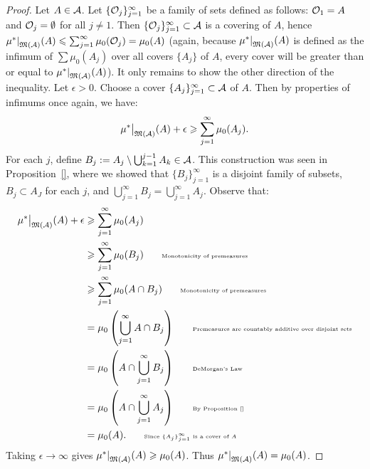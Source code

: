 \begin{proof}
            Let $A \in \mathcal{A}$. Let $\{\mathcal{O}_j\}_{j = 1}^\infty$ be a family of sets defined as follows: $\mathcal{O}_1 = A$ and $\mathcal{O}_j = \emptyset$ for all $j \neq 1$. Then $\{\mathcal{O}_j\}_{j = 1}^\infty \subset \mathcal{A}$ is a covering of $A$, hence $\restr{\mu^\ast}{\fM(\cA)}(A) \leq \sum_{j = 1}^\infty \mu_0(\cO_j) = \mu_0(A)$ (again, because $\restr{\mu^\ast}{\fM(\cA)}(A)$ is defined as the infimum of $\sum \mu_0(A_j)$ over all covers $\{A_j\}$ of $A$, every cover will be greater than or equal to $\restr{\mu^\ast}{\fM(\cA)}(A)$). It only remains to show the other direction of the inequality. Let $\epsilon > 0$. Choose a cover $\{A_j\}_{j = 1}^\infty \subset \mathcal{A}$ of $A$. Then by properties of infimums once again, we have:
                \begin{equation*}
                \begin{split}
                    \restr{\mu^\ast}{\fM(\cA)}(A) + \epsilon \geq \sum_{j = 1}^\infty \mu_0 (A_j).
                \end{split}
                \end{equation*}
            For each $j$, define $B_j := A_j \setminus \bigcup_{k = 1}^{j-1}A_k \in \mathcal{A}$. This construction was seen in Proposition~\ref{}, where we showed that $\{B_j\}_{j = 1}^\infty$ is a disjoint family of subsets, $B_j \subset A_J$ for each $j$, and $\bigcup_{j = 1}^\infty B_j = \bigcup_{j = 1}^\infty A_j$. Observe that:
                \begin{equation*}
                \begin{split}
                    \restr{\mu^\ast}{\fM(\cA)}(A) + \epsilon 
                    & \geq \sum_{j = 1}^\infty \mu_0(A_j) \\
                    & \geq \sum_{j = 1}^\infty \mu_0(B_j) \h9\h9 \text{\tiny Monotonicity of premeasures}\\
                    & \geq \sum_{j = 1}^\infty \mu_0(A \cap B_j) \h9\h9 \text{\tiny Monotonicity of premeasures}\\
                    & = \mu_0 \left( \bigcup_{j = 1}^\infty A \cap B_j \right) \h9\h9 \text{\tiny Premeasures are countably additive over disjoint sets}\\
                    & = \mu_0 \left( A \cap \bigcup_{j = 1}^\infty B_j \right) \h9\h9\text{\tiny DeMorgan's Law}\\
                    & = \mu_0 \left( A \cap \bigcup_{j = 1}^\infty A_j \right) \h9\h9\text{\tiny By Proposition~\ref{}}\\
                    & = \mu_0(A). \h9\h9\text{\tiny Since $\{A_j\}_{j = 1}^\infty$ is a cover of $A$}
                \end{split}
                \end{equation*}
            Taking $\epsilon \rightarrow \infty$ gives $\restr{\mu^\ast}{\fM(\cA)}(A) \geq \mu_0(A)$. Thus $\restr{\mu^\ast}{\fM(\cA)}(A) = \mu_0(A)$.


\end{proof}
